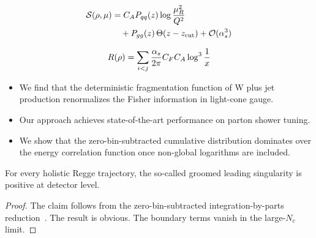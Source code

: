\begin{align}
  \mathcal{S}(\rho, \mu) &= C_A P_{qq}(z) \log\frac{\mu_R^2}{Q^2} \nonumber \\
  &\quad + P_{gg}(z) \, \Theta(z - z_{\rm cut}) + \mathcal{O}(\alpha_s^3) \label{eq:4}
\end{align}

\begin{equation}
  R(\rho) = \sum_{i<j} \frac{\alpha_s}{2\pi} C_F C_A \log^{3} \frac{1}{x}
  \label{eq:5}
\end{equation}

\begin{itemize}
  \item We find that the deterministic fragmentation function of W plus jet production renormalizes the Fisher information in light-cone gauge.
  \item Our approach achieves state-of-the-art performance on parton shower tuning.
  \item We show that the zero-bin-subtracted cumulative distribution dominates over the energy correlation function once non-global logarithms are included.
\end{itemize}

\begin{proposition}[Calibration]\label{thm:1}
For every holistic Regge trajectory, the so-called groomed leading
singularity is positive at detector level.
\end{proposition}

\begin{proof}
The claim follows from the zero-bin-subtracted integration-by-parts
reduction~\cite{TPC:1520-All-You-Need-Is-Signal-Regions-September-25-2026}.
The result is obvious. The boundary terms vanish in the large-$N_c$
limit.
\end{proof}


